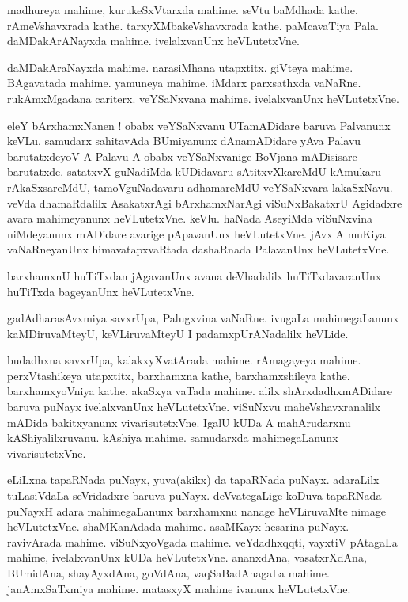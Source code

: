\documentclass{article}
\begin{document}
\begin{mn}%
madhureya mahime, kurukeSxVtarxda mahime. seVtu baMdhada kathe. rAmeVshavxrada kathe. 
tarxyXMbakeVshavxrada kathe. paMcavaTiya Pala. daMDakArANayxda mahime. ivelalxvanUnx 
heVLutetxVne.
\end{mn}

\begin{mn}%
daMDakAraNayxda mahime. narasiMhana utapxtitx. giVteya mahime. BAgavatada mahime. yamuneya 
mahime. iMdarx parxsathxda vaNaRne. rukAmxMgadana cariterx. veYSaNxvana mahime. 
ivelalxvanUnx heVLutetxVne.
\end{mn}

\begin{mn}%
eleY bArxhamxNanen ! obabx veYSaNxvanu UTamADidare baruva Palvanunx keVLu. samudarx 
sahitavAda BUmiyanunx dAnamADidare yAva Palavu barutatxdeyoV A Palavu A obabx veYSaNxvanige 
BoVjana mADisisare barutatxde. satatxvX guNadiMda kUDidavaru sAtitxvXkareMdU kAmukaru 
rAkaSxsareMdU, tamoVguNadavaru adhamareMdU veYSaNxvara lakaSxNavu. veVda dhamaRdalilx 
AsakatxrAgi bArxhamxNarAgi viSuNxBakatxrU Agidadxre avara mahimeyanunx heVLutetxVne. keVlu. 
haNada AseyiMda viSuNxvina niMdeyanunx mADidare avarige pApavanUnx heVLutetxVne. jAvxlA 
muKiya vaNaRneyanUnx himavatapxvaRtada dashaRnada PalavanUnx heVLutetxVne.
\end{mn}

\begin{mn}%
barxhamxnU huTiTxdan jAgavanUnx avana deVhadalilx huTiTxdavaranUnx huTiTxda bageyanUnx 
heVLutetxVne.
\end{mn}

\begin{mn}%
gadAdharasAvxmiya savxrUpa, Palugxvina vaNaRne. ivugaLa mahimegaLanunx kaMDiruvaMteyU, 
keVLiruvaMteyU I padamxpUrANadalilx heVLide.
\end{mn}

\begin{mn}%
budadhxna savxrUpa, kalakxyXvatArada mahime. rAmagayeya mahime. perxVtashikeya utapxtitx, 
barxhamxna kathe, barxhamxshileya kathe. barxhamxyoVniya kathe. akaSxya vaTada mahime. alilx 
shArxdadhxmADidare baruva puNayx ivelalxvanUnx heVLutetxVne. viSuNxvu maheVshavxranalilx 
mADida bakitxyanunx vivarisutetxVne. IgalU kUDa A mahArudarxnu kAShiyalilxruvanu. kAshiya 
mahime. samudarxda mahimegaLanunx vivarisutetxVne.
\end{mn}

\begin{mn}%
eLiLxna tapaRNada puNayx, yuva(akikx) da tapaRNada puNayx. adaraLilx tuLasiVdaLa seVridadxre 
baruva puNayx. deVvategaLige koDuva tapaRNada puNayxH adara mahimegaLanunx barxhamxnu  
nanage heVLiruvaMte nimage heVLutetxVne. shaMKanAdada mahime. asaMKayx hesarina puNayx. 
ravivArada mahime. viSuNxyoVgada mahime. veYdadhxqqti, vayxtiV pAtagaLa mahime, 
ivelalxvanUnx kUDa heVLutetxVne. ananxdAna, vasatxrXdAna, BUmidAna, shayAyxdAna, goVdAna, 
vaqSaBadAnagaLa mahime. janAmxSaTxmiya mahime. matasxyX mahime ivanunx heVLutetxVne.
\end{mn}
\end{document}
